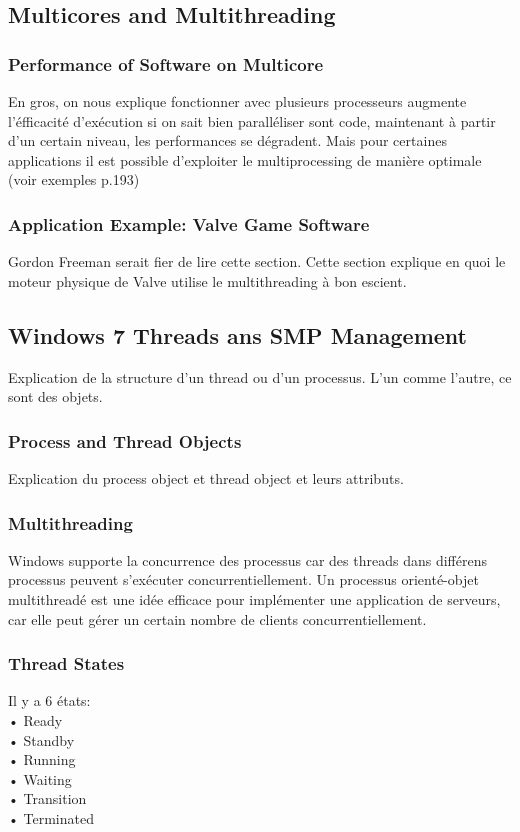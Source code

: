 \subsection{Multicores and Multithreading}
\subsubsection{Performance of Software on Multicore}
En gros, on nous explique fonctionner avec plusieurs processeurs augmente l’éfficacité d’exécution si on sait bien paralléliser sont code, maintenant à partir d’un certain niveau, les performances se dégradent. Mais pour certaines applications il est possible d’exploiter le multiprocessing de manière optimale (voir exemples p.193)
\subsubsection{Application Example: Valve Game Software}
Gordon Freeman serait fier de lire cette section. Cette section explique en quoi le moteur physique de Valve utilise le multithreading à bon escient.
\subsection{Windows 7 Threads ans SMP Management}
Explication de la structure d’un thread ou d’un processus. L’un comme l’autre, ce sont des objets.
\subsubsection{Process and Thread Objects}
Explication du process object et thread object et leurs attributs.
\subsubsection{Multithreading}
Windows supporte la concurrence des processus car des threads dans différens processus peuvent s’exécuter concurrentiellement. Un processus orienté-objet multithreadé est une idée efficace pour implémenter une application de serveurs, car elle peut gérer un certain nombre de clients concurrentiellement.
\subsubsection{Thread States}
Il y a 6 états: \\
• Ready \\
• Standby \\
• Running \\
• Waiting \\
• Transition \\
• Terminated \\
